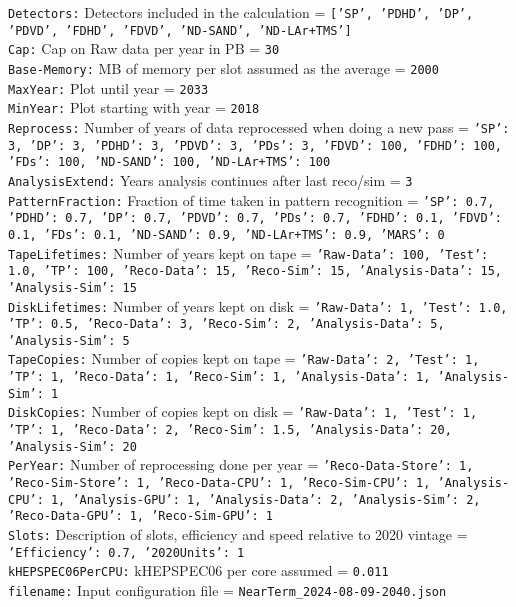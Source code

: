 {\tt Detectors:} Detectors included in the calculation = {\tt ['SP', 'PDHD', 'DP', 'PDVD', 'FDHD', 'FDVD', 'ND-SAND', 'ND-LAr+TMS']} \\
{\tt Cap:} Cap on Raw data per year in PB = {\tt 30} \\
{\tt Base-Memory:} MB of memory per slot assumed as the average = {\tt 2000} \\
{\tt MaxYear:} Plot until year = {\tt 2033} \\
{\tt MinYear:} Plot starting with year = {\tt 2018} \\
{\tt Reprocess:} Number of years of data reprocessed when doing a new pass = {\tt {'SP': 3, 'DP': 3, 'PDHD': 3, 'PDVD': 3, 'PDs': 3, 'FDVD': 100, 'FDHD': 100, 'FDs': 100, 'ND-SAND': 100, 'ND-LAr+TMS': 100}} \\
{\tt AnalysisExtend:} Years analysis continues after last reco/sim = {\tt 3} \\
{\tt PatternFraction:} Fraction of time taken in pattern recognition = {\tt {'SP': 0.7, 'PDHD': 0.7, 'DP': 0.7, 'PDVD': 0.7, 'PDs': 0.7, 'FDHD': 0.1, 'FDVD': 0.1, 'FDs': 0.1, 'ND-SAND': 0.9, 'ND-LAr+TMS': 0.9, 'MARS': 0}} \\
{\tt TapeLifetimes:} Number of years kept on tape = {\tt {'Raw-Data': 100, 'Test': 1.0, 'TP': 100, 'Reco-Data': 15, 'Reco-Sim': 15, 'Analysis-Data': 15, 'Analysis-Sim': 15}} \\
{\tt DiskLifetimes:} Number of years kept on disk = {\tt {'Raw-Data': 1, 'Test': 1.0, 'TP': 0.5, 'Reco-Data': 3, 'Reco-Sim': 2, 'Analysis-Data': 5, 'Analysis-Sim': 5}} \\
{\tt TapeCopies:} Number of copies kept on tape = {\tt {'Raw-Data': 2, 'Test': 1, 'TP': 1, 'Reco-Data': 1, 'Reco-Sim': 1, 'Analysis-Data': 1, 'Analysis-Sim': 1}} \\
{\tt DiskCopies:} Number of copies kept on disk = {\tt {'Raw-Data': 1, 'Test': 1, 'TP': 1, 'Reco-Data': 2, 'Reco-Sim': 1.5, 'Analysis-Data': 20, 'Analysis-Sim': 20}} \\
{\tt PerYear:} Number of reprocessing done per year = {\tt {'Reco-Data-Store': 1, 'Reco-Sim-Store': 1, 'Reco-Data-CPU': 1, 'Reco-Sim-CPU': 1, 'Analysis-CPU': 1, 'Analysis-GPU': 1, 'Analysis-Data': 2, 'Analysis-Sim': 2, 'Reco-Data-GPU': 1, 'Reco-Sim-GPU': 1}} \\
{\tt Slots:} Description of slots, efficiency and speed relative to 2020 vintage = {\tt {'Efficiency': 0.7, '2020Units': 1}} \\
{\tt kHEPSPEC06PerCPU:} kHEPSPEC06 per core assumed = {\tt 0.011} \\
{\tt filename:} Input configuration file = {\tt NearTerm\_2024-08-09-2040.json} \\
